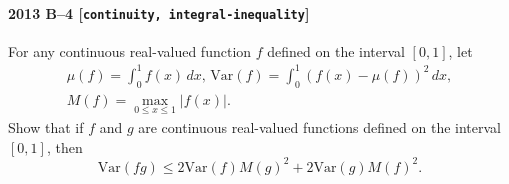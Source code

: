 \paragraph{2013 B--4 \textnormal{[\texttt{continuity, integral-inequality}]}}
For any continuous real-valued function $f$ defined on the interval $[0,1]$, let
\begin{gather*}
\mu(f) = \int_0^1 f(x)\,dx, \,
\mathrm{Var}(f) = \int_0^1 (f(x) - \mu(f))^2\,dx, \\
M(f) = \max_{0 \leq x \leq 1} \left| f(x) \right|.
\end{gather*}
Show that if $f$ and $g$ are continuous real-valued functions
defined on the interval $[0,1]$,
then
\[
\mathrm{Var}(fg) \leq 2 \mathrm{Var}(f) M(g)^2 + 2 \mathrm{Var}(g) M(f)^2.
\]
